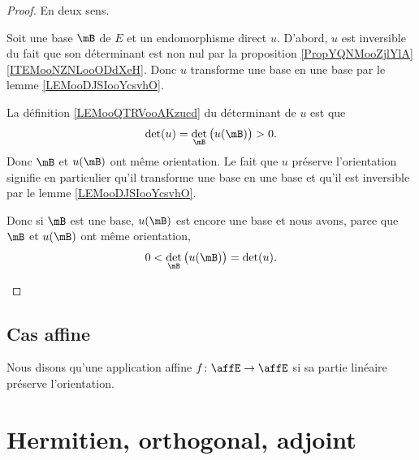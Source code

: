 \begin{proof}
	En deux sens.
	\begin{subproof}
		Soit une base \( \mB\) de \( E\) et un endomorphisme direct \( u\). D'abord, \( u\) est inversible du fait que son déterminant est non nul par la proposition \ref{PropYQNMooZjlYlA}\ref{ITEMooNZNLooODdXeH}. Donc \( u\) transforme une base en une base par le lemme \ref{LEMooDJSIooYcsvhO}.

		La définition \ref{LEMooQTRVooAKzucd} du déterminant de \( u\) est que
		\begin{equation}
			\det(u)=\det_{\mB}\big( u(\mB) \big)>0.
		\end{equation}
		Donc \( \mB\) et \( u(\mB)\) ont même orientation.
		Le fait que \( u\) préserve l'orientation signifie en particulier qu'il transforme une base en une base et qu'il est inversible par le lemme \ref{LEMooDJSIooYcsvhO}.

		Donc si \( \mB\) est une base, \( u(\mB)\) est encore une base et nous avons, parce que \( \mB\) et \( u(\mB)\) ont même orientation,
		\begin{equation}
			0<\det_{\mB}\big( u(\mB) \big)=\det(u).
		\end{equation}
	\end{subproof}
\end{proof}

\subsection{Cas affine}

\begin{definition}      \label{DEFooOTFPooIVkHFP}
	Nous disons qu'une application affine \( f\colon \affE\to \affE\)  si sa partie linéaire préserve l'orientation.
\end{definition}


\section{Hermitien, orthogonal, adjoint}


